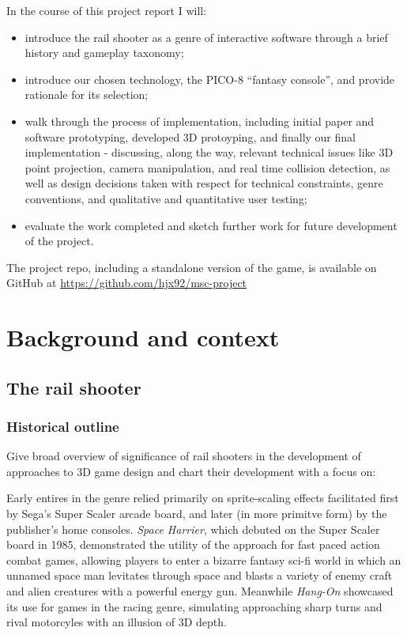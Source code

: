 \documentclass[11pt]{article}
\begin{document}
In the course of this project report I will:

\begin{itemize}
   \item introduce the rail shooter as a genre of interactive software through a brief history and gameplay taxonomy;
   \item introduce our chosen technology, the PICO-8 ``fantasy console'', and provide rationale for its selection;
   \item walk through the process of implementation, including initial paper and software prototyping, developed 3D 
   protoyping, and finally our final implementation - discussing, along the way, relevant technical issues like 
   3D point projection, camera manipulation, and real time collision detection, as well as design decisions taken
   with respect for technical constraints, genre conventions, and qualitative and quantitative user testing;
   \item evaluate the work completed and sketch further work for future development of the project.
\end{itemize}

The project repo, including a standalone version of the game, is available on GitHub at 
\url{https://github.com/hjx92/msc-project}


\section{Background and context}

\subsection{The rail shooter}\label{genre}

\subsubsection*{Historical outline}
Give broad overview of significance of rail shooters in the development of approaches
to 3D game design and chart their development with a focus on:

Early entires in the genre relied primarily on sprite-scaling effects facilitated first by
Sega's Super Scaler arcade board, and later (in more primitve form) by the publisher's
home consoles. \textit{Space Harrier}\cite{space_harrier}, which debuted on the Super Scaler board in 1985, demonstrated
the utility of the approach for fast paced action combat games, allowing players to enter a bizarre
fantasy sci-fi world in which an unnamed space man levitates through space and blasts a variety of
enemy craft and alien creatures with a powerful energy gun. Meanwhile \textit{Hang-On} showcased its use
for games in the racing genre, simulating approaching sharp turns and rival motorcyles with an illusion
of 3D depth.
\end{document}
